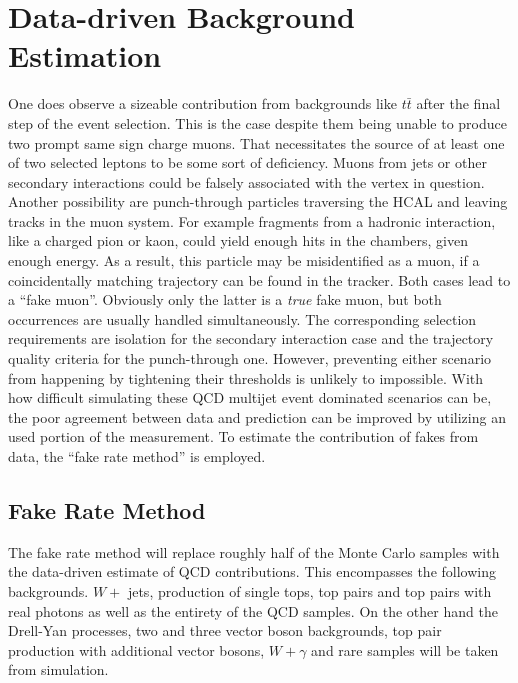 \chapter{Data-driven Background Estimation}
\label{cha:datadrivenbg}

One does observe a sizeable contribution from backgrounds like $t\bar{t}$ after the final step of the event selection. This is the case despite them being unable to produce two prompt same sign charge muons. That necessitates the source of at least one of two selected leptons to be some sort of deficiency. Muons from jets or other secondary interactions could be falsely associated with the vertex in question. Another possibility are punch-through particles traversing the HCAL and leaving tracks in the muon system. For example fragments from a hadronic interaction, like a charged pion or kaon, could yield enough hits in the chambers, given enough energy. As a result, this particle may be misidentified as a muon, if a coincidentally matching trajectory can be found in the tracker. Both cases lead to a ``fake muon''. Obviously only the latter is a \textit{true} fake muon, but both occurrences are usually handled simultaneously. The corresponding selection requirements are isolation for the secondary interaction case and the trajectory quality criteria for the punch-through one. However, preventing either scenario from happening by tightening their thresholds is unlikely to impossible. With how difficult simulating these QCD multijet event dominated scenarios can be, the poor agreement between data and prediction can be improved by utilizing an used portion of the measurement. To estimate the contribution of fakes from data, the ``fake rate method'' is employed.


\section{Fake Rate Method}
\label{sec:fakerate}

The fake rate method will replace roughly half of the Monte Carlo samples with the data-driven estimate of QCD contributions. This encompasses the following backgrounds. $W +$ jets, production of single tops, top pairs and top pairs with real photons as well as the entirety of the QCD samples. On the other hand the Drell-Yan processes, two and three vector boson backgrounds, top pair production with additional vector bosons, $W + \gamma$ and rare samples will be taken from simulation.

